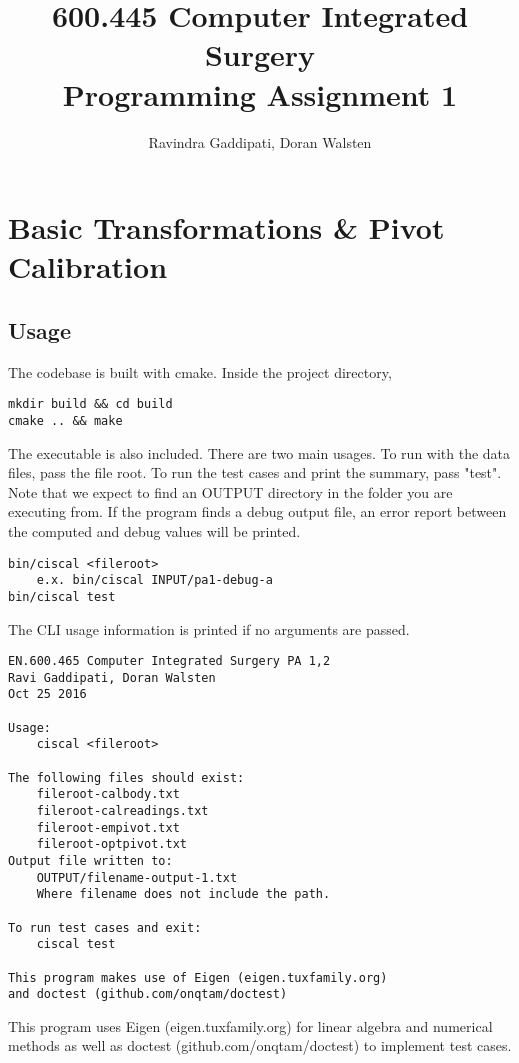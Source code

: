 \documentclass[letterpaper, 11pt]{report}
\begin{document}
\title{600.445 Computer Integrated Surgery \\ Programming Assignment 1}
\author{Ravindra Gaddipati, Doran Walsten}
\maketitle

\pagebreak

\chapter*{Basic Transformations \& Pivot Calibration}
\setcounter{chapter}{1}

\section{Usage}
The codebase is built with cmake. Inside the project directory,
\begin{verbatim}
mkdir build && cd build
cmake .. && make
\end{verbatim}
The executable is also included.
There are two main usages. To run with the data files, pass the file root. To run the test cases and print the summary, pass "test". Note that we expect to find an OUTPUT directory in the folder you are executing from. If the program finds a debug output file, an error report between the computed and debug values will be printed.
\begin{verbatim}
bin/ciscal <fileroot>
    e.x. bin/ciscal INPUT/pa1-debug-a
bin/ciscal test
\end{verbatim}
The CLI usage information is printed if no arguments are passed.
\begin{verbatim}
EN.600.465 Computer Integrated Surgery PA 1,2
Ravi Gaddipati, Doran Walsten
Oct 25 2016

Usage:
	ciscal <fileroot>

The following files should exist:
	fileroot-calbody.txt
	fileroot-calreadings.txt
	fileroot-empivot.txt
	fileroot-optpivot.txt
Output file written to:
	OUTPUT/filename-output-1.txt
	Where filename does not include the path.

To run test cases and exit:
	ciscal test

This program makes use of Eigen (eigen.tuxfamily.org)
and doctest (github.com/onqtam/doctest)
\end{verbatim}
This program uses Eigen (eigen.tuxfamily.org) for linear algebra and numerical methods as well as doctest (github.com/onqtam/doctest) to implement test cases.
\end{document}
